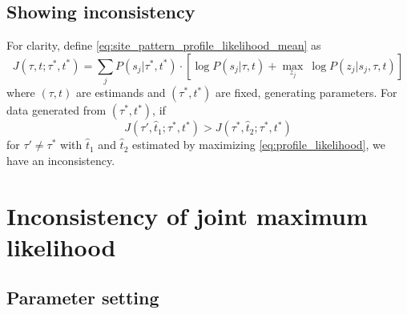 \documentclass[a4paper]{article}
\begin{document}
\subsection{Showing inconsistency}

For clarity, define \eqref{eq:site_pattern_profile_likelihood_mean} as
$$
J(\tau, t; \tau^*, t^*) = \sum_{j} P(s_j | \tau^*, t^*) \cdot [\log P(s_j | \tau, t) + \max_{z_j} \ \log P(z_j | s_j, \tau, t)]
$$
where $(\tau, t)$ are estimands and $(\tau^*, t^*)$ are fixed, generating parameters.
For data generated from $(\tau^*, t^*)$, if
\begin{equation}
\label{eq:inconsistency_inequality}
J(\tau', \hat{t}_1; \tau^*, t^*) > J(\tau^*, \hat{t}_2; \tau^*, t^*)
\end{equation}
for $\tau'\neq\tau^*$ with $\hat{t}_1$ and $\hat{t}_2$ estimated by maximizing \eqref{eq:profile_likelihood}, we have an inconsistency.

\section{Inconsistency of joint maximum likelihood}

\subsection{Parameter setting}
\end{document}

